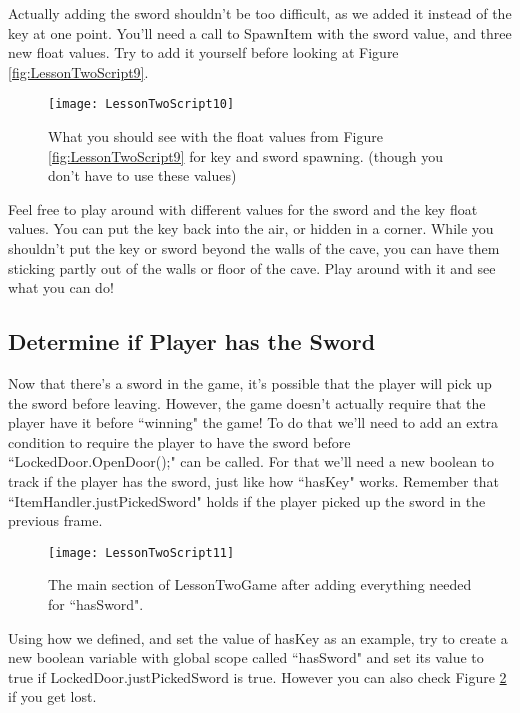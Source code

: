 \documentclass{article}
\begin{document}
Actually adding the sword shouldn't be too difficult, as we added it instead of the key at one point. You'll need a call to SpawnItem with the sword value, and three new float values. Try to add it yourself before looking at Figure \ref{fig:LessonTwoScript9}.

\begin{figure}
  \texttt{[image: LessonTwoScript10]}
  \caption{What you should see with the float values from Figure \ref{fig:LessonTwoScript9} for key and sword spawning. (though you don't have to use these values)}
  \label{fig:LessonTwoScript10}
\end{figure}

\noindent{} 

Feel free to play around with different values for the sword and the key float values. You can put the key back into the air, or hidden in a corner. While you shouldn't put the key or sword beyond the walls of the cave, you can have them sticking partly out of the walls or floor of the cave. Play around with it and see what you can do!

 \subsection{Determine if Player has the Sword}
 
 Now that there's a sword in the game, it's possible that the player will pick up the sword before leaving. However, the game doesn't actually require that the player have it before ``winning" the game! To do that we'll need to add an extra condition to require the player to have the sword before ``LockedDoor.OpenDoor();" can be called. For that we'll need a new boolean to track if the player has the sword, just like how ``hasKey" works. Remember that ``ItemHandler.justPickedSword" holds if the player picked up the sword in the previous frame. 
 
 \begin{figure}
  \texttt{[image: LessonTwoScript11]}
  \caption{The main section of LessonTwoGame after adding everything needed for ``hasSword".}
  \label{fig:LessonTwoScript11}
\end{figure}
 
 Using how we defined, and set the value of hasKey as an example, try to create a new boolean variable with global scope called ``hasSword" and set its value to true if LockedDoor.justPickedSword is true. However you can also check Figure \ref{fig:LessonTwoScript11} if you get lost.
 
\end{document}
